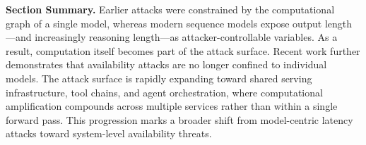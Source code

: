 \documentclass[acmsmall,screen,review,nonacm]{acmart}
\begin{document}


\textbf{Section Summary.} Earlier attacks were constrained by the computational graph of a single model, whereas modern sequence models expose output length—and increasingly reasoning length—as attacker-controllable variables. As a result, computation itself becomes part of the attack surface. Recent work further demonstrates that availability attacks are no longer confined to individual models. The attack surface is rapidly expanding toward shared serving infrastructure, tool chains, and agent orchestration, where computational amplification compounds across multiple services rather than within a single forward pass. This progression marks a broader shift from model-centric latency attacks toward system-level availability threats.
\end{document}
